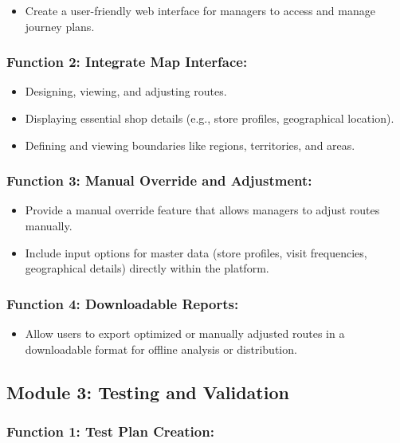 \begin{itemize}
    \item Create a user-friendly web interface for managers to access and manage journey plans.
\end{itemize}
\subsubsection*{Function 2: Integrate Map Interface:
}

    \begin{itemize}
        \item Designing, viewing, and adjusting routes.
        \item Displaying essential shop details (e.g., store profiles, geographical location).
        \item Defining and viewing boundaries like regions, territories, and areas.
    \end{itemize}

\subsubsection*{Function 3: Manual Override and Adjustment: 
}

\begin{itemize}
    \item Provide a manual override feature that allows managers to adjust routes manually.
    \item Include input options for master data (store profiles, visit frequencies, geographical details) directly within the platform.
\end{itemize}

\subsubsection*{Function 4: Downloadable Reports: 
}

\begin{itemize}
    \item Allow users to export optimized or manually adjusted routes in a downloadable format for offline analysis or distribution.
\end{itemize}

\subsection*{Module 3: Testing and Validation }

\subsubsection*{Function 1: Test Plan Creation: 
}

